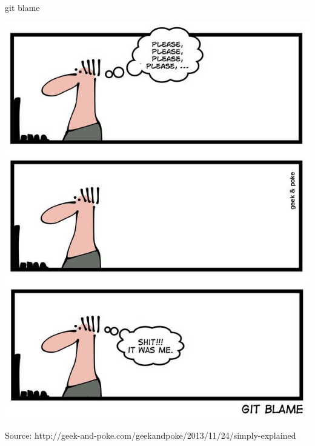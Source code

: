 \begin{frame}[fragile]{git blame}
    \begin{center}
        \includegraphics[height=0.85\textheight]{images/git-blame2.jpg}
    \end{center}
    \vfill\pause
    {\tiny Source: http://geek-and-poke.com/geekandpoke/2013/11/24/simply-explained}
\end{frame}




